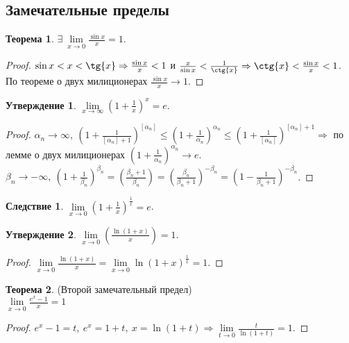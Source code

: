 \documentclass[a4paper, 12pt]{article}
\theoremstyle{definition}
\newtheorem*{theorem}{Теорема}
\newtheorem*{consequense}{Следствие}
\newtheorem*{statement}{Утверждение}
\begin{document}
    \subsection{Замечательные пределы}
        \begin{theorem}
            $\exists\ \lim\limits_{x\to 0} \frac{\sin{x}}{x}=1$.
        \end{theorem}     
        \begin{proof}
            $\sin{x}<x<\tg{x}\Rightarrow \frac{\sin{x}}{x}<1$ и $\frac{x}{\sin{x}}<\frac{1}{\ctg{x}}\\
            \Rightarrow \ctg{x}<\frac{\sin{x}}{x}<1$. По теореме о двух милиционерах $\frac{\sin{x}}{x}\to 1$.
        \end{proof}
        \begin{statement}
            $\lim\limits_{x\to \infty}(1+\frac{1}{x})^x=e$.
        \end{statement} 
        \begin{proof}
            $\alpha_n\to \infty,\ (1+\frac{1}{[\alpha_n]+1})^{[\alpha_n]} \leq(1+\frac{1}{\alpha_n})^{\alpha_n}\leq (1+\frac{1}{[\alpha_n]})^{[\alpha_n]+1} \Rightarrow$ по лемме о двух милиционерах $(1+\frac{1}{\alpha_n})^{\alpha_n}\to e$. $\beta_n\to -\infty,\ (1+\frac{1}{\beta_n})^{\beta_n}=(\frac{\beta_n+1}{\beta_n})=(\frac{\beta_n}{\beta_n+1})^{-\beta_n}=(1-\frac{1}{\beta_n+1})^{-\beta_n}$.
        \end{proof} 
        \begin{consequense}
            $\lim\limits_{x\to 0}(1+\frac{1}{x})^{\frac{1}{x}}=e$.
        \end{consequense} 
        \begin{statement}
            $\lim\limits_{x\to 0}(\frac{\ln{(1+x)}}{x})=1$.
        \end{statement} 
        \begin{proof}
            $\lim\limits_{x\to 0}\frac{\ln{(1+x)}}{x}=\lim\limits_{x\to 0}\ln{(1+x)^{\frac{1}{x}}}=1$.
        \end{proof} 
        \begin{theorem} (Второй замечательный предел)\\
            $\lim\limits_{x\to 0}\frac{e^x-1}{x}=1$
        \end{theorem} 
        \begin{proof}
            $e^x-1=t,\ e^x=1+t,\ x=\ln{(1+t)} \Rightarrow \lim\limits_{t\to 0}\frac{t}{\ln{(1+t)}}=1$.
        \end{proof} 
        \newpage
\end{document}
